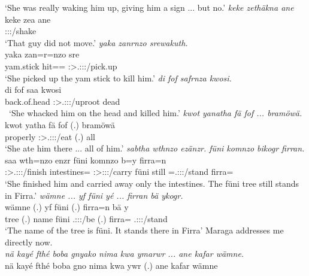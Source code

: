 \begin{exe}
	\trans `She was really waking him up, giving him a sign ... but no.'
	\emph{keke zethäkna ane}\\
	\gll keke zea ane\\
	{\Neg} \Sg:\Sbj:\Pst:\Pfv/shake {\Dem}\\
	\trans `That guy did not move.'
	\emph{yaka zanrnzo srewakuth.}\\
	\gll yaka zan=r=nzo sre\\
	yam.stick hit=\Purp={\Only} \Sg:\Sbj>\Tsg.\Masc:\Obj:\Irr:\Pfv/pick.up\\
	\trans `She picked up the yam stick to kill him.'
	\emph{di fof safrnza kwosi.}\\
	\gll di fof saa kwosi\\
	{back.of.head} {\Emph} \Sg:\Sbj>\Tsg.\Masc:\Obj:\Pst:\Pfv/uproot dead\\\
	\trans `She whacked him on the head and killed him.'
	\emph{kwot yanatha fä fof ... bramöwä.}\\
	\gll kwot yatha fä fof (.) bramöwä\\
	properly \Sg:\Sbj>\Tsg.\Masc:\Obj:\Pst:\Ipfv/eat {\Dist} {\Emph} (.) all\\
	\trans `She ate him there ... all of him.'
	\emph{sabtha wthnzo ezänzr. füni komnzo bikogr firran.}\\
	\gll saa wth=nzo enzr füni komnzo b=y firra=n\\
	\Sg:\Sbj>\Tsg.\Masc:\Obj:\Pst:\Pfv/finish intestines={\Only} \Stsg:\Sbj>\Stpl:\Obj:\Nonpast:\Ipfv/carry füni  still \Med=\Tsg.\Masc:\Sbj:\Nonpast:\Stat/stand firra={\Loc}\\
	\trans `She finished him and carried away only the intestines. The füni tree still stands in Firra.'
\exi{50}
	\emph{wämne ... yf füni yé ... firran bä ykogr.}\\
	\gll wämne (.) yf füni  (.) firra=n bä y\\
	tree (.) name füni \Tsg.\Masc:\Sbj:\Nonpast:\Ipfv/be (.) firra={\Loc} \Med{} \Tsg.\Masc:\Sbj:\Nonpast:\Stat/stand\\
	\trans `The name of the tree is füni. It stands there in Firra'
\exi{51}
	{\footnotesize{Maraga addresses me directly now.}}\\
	\emph{nä kayé fthé boba gnyako nima kwa ymarwr ... ane kafar wämne.}\\
	\gll nä kayé fthé boba gn\stem{yak}o nima kwa y\stem{mar}wr (.) ane kafar wämne\\

\end{exe}
